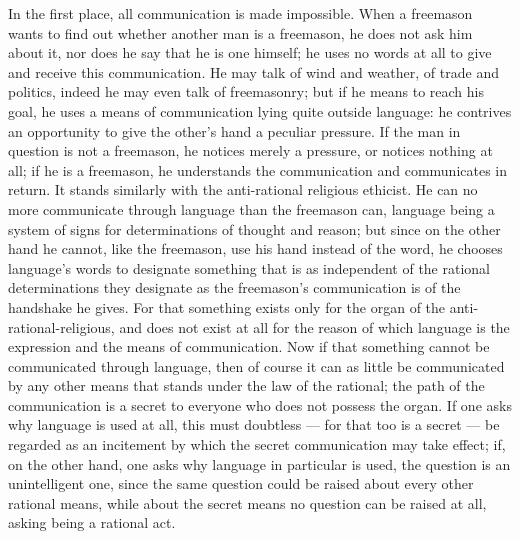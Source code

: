\documentclass[12pt,a4paper]{book}
\newcommand{\opage}[1]{\marginnote{\footnotesize\textit{[#1]}}}
\begin{document}
In the first place, all communication is made impossible. When a freemason
wants to find out whether another man is a freemason, he does not ask him about
it, nor does he say that he is one himself; he uses no words at all to give and
receive this communication. He may talk of wind and weather, of trade and
politics, indeed he may even talk of freemasonry; but if he means to reach his
goal, he uses a means of communication lying quite outside language: he
contrives an opportunity to give the other's hand a peculiar pressure. If the
man in question is not a freemason, he notices merely a pressure, or notices
nothing at all; if he is a freemason, he understands the communication and
communicates in return. It stands similarly with the anti-rational religious
ethicist. He can no more communicate through language than the freemason can,
language being a system of signs for determinations of thought and reason; but
since on the other hand he cannot, like the freemason, use his hand instead of
the word, he chooses language's words to designate something that is as
independent of the rational determinations they designate as the freemason's
communication is of the handshake he gives. For that something exists only for
the organ of the anti-rational-religious, and does not exist at all for the
reason of which language is the expression and the means of communication. Now
if that something cannot
\opage{50}be communicated through language, then of course it can as little be
communicated by any other means that stands under the law of the rational; the
path of the communication is a secret to everyone who does not possess the
organ. If one asks why language is used at all, this must doubtless --- for
that too is a secret --- be regarded as an incitement by which the secret
communication may take effect; if, on the other hand, one asks why language in
particular is used, the question is an unintelligent one, since the same
question could be raised about every other rational means, while about the
secret means no question can be raised at all, asking being a rational act.
\end{document}
